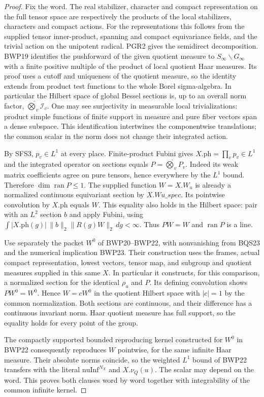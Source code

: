 \begin{proof}
Fix the word. The real stabilizer, character and compact
representation on the full tensor space are respectively the
products of the local stabilizers, characters and compact
actions. For the representations this follows from the supplied
tensor inner-product, spanning and compact equivariance fields,
and the trivial action on the unipotent radical. PGR2 gives
the semidirect decomposition. BWP19 identifies the pushforward
of the given quotient measure to $S_\infty\backslash G_\infty$
with a finite positive multiple of the product of local quotient
Haar measures. Its proof uses a cutoff and uniqueness of the
quotient measure, so the identity extends from product test
functions to the whole Borel sigma-algebra. In particular the
Hilbert space of global Bessel sections is, up to an overall
norm factor, $\widehat\bigotimes_v\mathcal I_v$.
One may see surjectivity in measurable local trivializations:
product simple functions of finite support in measure and pure
fiber vectors span a dense subspace. This identification intertwines
the componentwise translations; the common scalar in the norm
does not change their integrated action.

By SFS3, $p_v\in L^1$ at every place. Finite-product Fubini gives
$X.\mathrm{ph}=\prod_v p_v\in L^1$ and the integrated
operator on sections equals $P=\widehat\bigotimes_v P_v$.
Indeed its weak matrix coefficients agree on pure tensors,
hence everywhere by the $L^1$ bound. Therefore
$\dim\operatorname{ran}P\le1$. The supplied function $W=X.W_u$
is already a normalized continuous equivariant section by
$X.Wu\_spec$. Its pointwise convolution by $X.\mathrm{ph}$
equals $W$. This equality also holds in the Hilbert space:
pair with an $L^2$ section $b$ and apply Fubini, using
$\int |X.\mathrm{ph}(g)|\,\|b\|_2\|R(g)W\|_2\,dg<\infty$.
Thus $PW=W$ and $\operatorname{ran}P$ is a line.

Use separately the packet $W^0$ of BWP20--BWP22, with nonvanishing
from BQS23 and the numerical implication BWP23. Their construction
uses the frames, actual compact representation, lowest vectors,
tensor map, and subgroup and quotient measures supplied in this
same $X$. In particular it constructs, for this comparison, a
normalized section for the identical $\rho_u$ and $P$.
Its defining convolution shows $PW^0=W^0$. Hence $W=cW^0$
in the quotient Hilbert space with $|c|=1$ by the common
normalization. Both sections are continuous, and their difference
has a continuous invariant norm. Haar quotient measure has full
support, so the equality holds for every point of the group.

The compactly supported bounded reproducing kernel constructed for
$W^0$ in BWP22 consequently reproduces $W$ pointwise, for the
same infinite Haar measure. Their absolute norms coincide, so
the weighted $L^1$ bound of BWP22 transfers with the literal
$\mathrm{nuInf}^{N_X}$ and $X.\nu_Q(u)$. The scalar may depend
on the word. This proves both clauses word by word together
with integrability of the common infinite kernel.
\end{proof}

